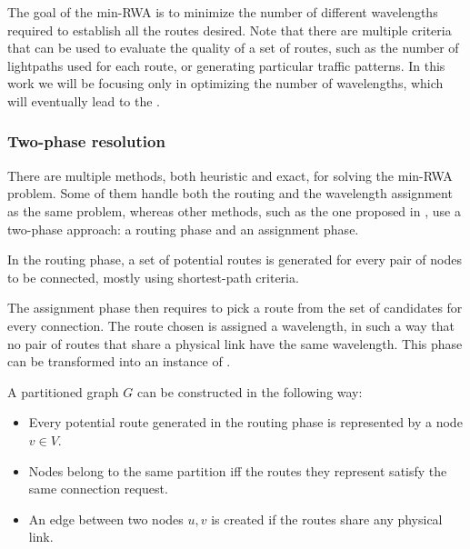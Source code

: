 The goal of the min-RWA is to minimize the number of different wavelengths required to establish all the routes desired. Note that there are multiple criteria that can be used to evaluate the quality of a set of routes, such as the number of lightpaths used for each route, or generating particular traffic patterns. In this work we will be focusing only in optimizing the number of wavelengths, which will eventually lead to the \PCP{}.

\subsubsection{Two-phase resolution}

There are multiple methods, both heuristic and exact, for solving the min-RWA problem. Some of them handle both the routing and the wavelength assignment as the same problem, whereas other methods, such as the one proposed in \cite{Li00thepartition}, use a two-phase approach: a routing phase and an assignment phase.

In the routing phase, a set of potential routes is generated for every pair of nodes to be connected, mostly using shortest-path criteria.

The assignment phase then requires to pick a route from the set of candidates for every connection. The route chosen is assigned a wavelength, in such a way that no pair of routes that share a physical link have the same wavelength. This phase can be transformed into an instance of \PCP{}.

A partitioned graph $G$ can be constructed in the following way:
\begin{itemize}
\item{Every potential route generated in the routing phase is represented by a node $v \in V$.}
\item{Nodes belong to the same partition iff the routes they represent satisfy the same connection request.}
\item{An edge between two nodes $u,v$ is created if the routes share any physical link.}
\end{itemize}

